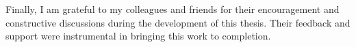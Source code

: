 \documentclass[12pt,a4paper]{article}
\begin{document}
    Finally, I am grateful to my colleagues and friends for their encouragement and constructive discussions during the development of this thesis. Their feedback and support were instrumental in bringing this work to completion.
    \clearpage

    \tableofcontents
    \clearpage

    \clearpage

    \clearpage

    
    \clearpage


    \pagestyle{main}

    

    

    
\end{document}
